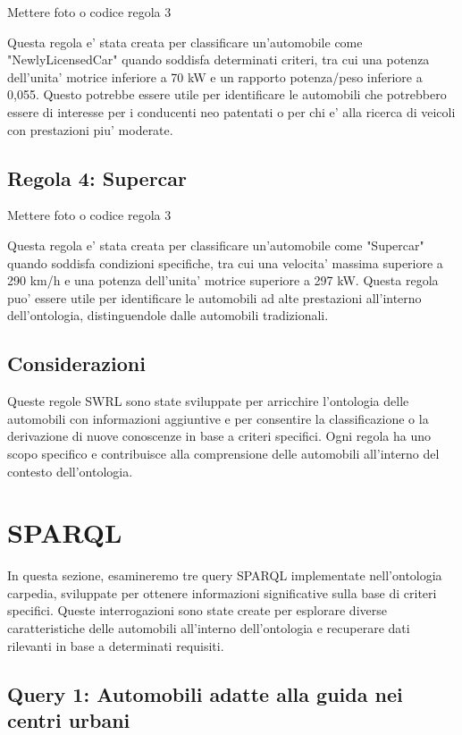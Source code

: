 Mettere foto o codice regola 3

Questa regola e' stata creata per classificare un'automobile come "NewlyLicensedCar" quando soddisfa
determinati criteri, tra cui una potenza dell'unita' motrice inferiore a 70 kW e un rapporto potenza/peso
inferiore a 0,055.
Questo potrebbe essere utile per identificare le automobili che potrebbero essere di interesse per i conducenti
neo patentati o per chi e' alla ricerca di veicoli con prestazioni piu' moderate.

\subsection{Regola 4: Supercar}

Mettere foto o codice regola 3

Questa regola e' stata creata per classificare un'automobile come "Supercar" quando soddisfa condizioni
specifiche, tra cui una velocita' massima superiore a 290 km/h e una potenza dell'unita' motrice superiore a 297 kW.
Questa regola puo' essere utile per identificare le automobili ad alte prestazioni all'interno dell'ontologia,
distinguendole dalle automobili tradizionali.

\subsection{Considerazioni}
Queste regole SWRL sono state sviluppate per arricchire l'ontologia delle automobili con informazioni
aggiuntive e per consentire la classificazione o la derivazione di nuove conoscenze in base a criteri specifici.
Ogni regola ha uno scopo specifico e contribuisce alla comprensione delle automobili all'interno del contesto
dell'ontologia.


\section{SPARQL}\label{sec:sparql}

In questa sezione, esamineremo tre query SPARQL implementate nell'ontologia carpedia,
sviluppate per ottenere informazioni significative sulla base di criteri specifici.
Queste interrogazioni sono state create per esplorare diverse caratteristiche delle automobili all'interno
dell'ontologia e recuperare dati rilevanti in base a determinati requisiti.

\subsection{Query 1: Automobili adatte alla guida nei centri urbani}

